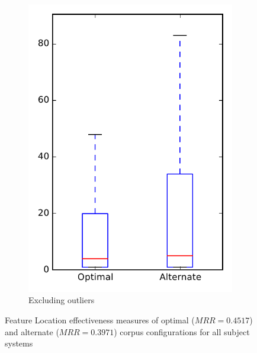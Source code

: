 \begin{figure}
\begin{subfigure}{.4\textwidth}
        \includegraphics[height=0.4\textheight]{figures/combo/flt_rq2_all_no_outlier}
        \caption{Excluding outliers}\label{fig:combo:flt:rq2:all_no_outlier}
    \end{subfigure}
\caption[Feature Location effectiveness measures of optimal and alternate corpus configurations for all subject systems]%
{Feature Location effectiveness measures of optimal ($MRR=0.4517$) and alternate ($MRR=0.3971$) corpus configurations for all subject systems}
\label{fig:combo:flt:rq2:all}
\end{figure}
